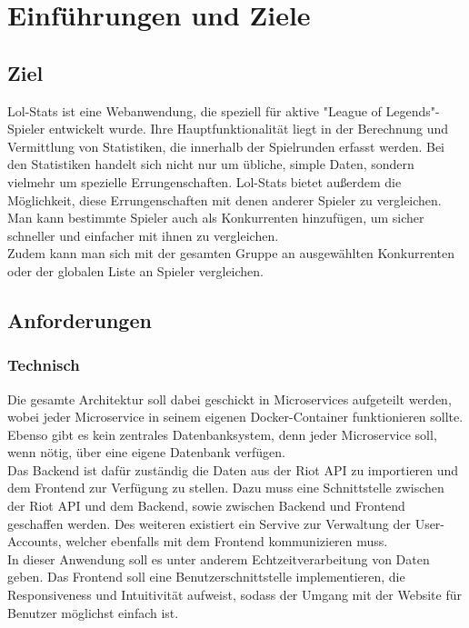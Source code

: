 \section{Einführungen und Ziele}
\subsection{Ziel}

Lol-Stats ist eine Webanwendung, die speziell für aktive "League of Legends"-Spieler entwickelt wurde. Ihre Hauptfunktionalität liegt in der Berechnung und Vermittlung
von Statistiken, die innerhalb der Spielrunden erfasst werden. Bei den Statistiken handelt sich nicht nur um übliche, simple Daten, sondern vielmehr um spezielle Errungenschaften. 
Lol-Stats bietet außerdem die Möglichkeit, diese Errungenschaften mit denen anderer Spieler zu vergleichen. Man kann bestimmte Spieler auch als Konkurrenten hinzufügen, um sicher schneller und einfacher mit ihnen zu vergleichen.\\
Zudem kann man sich mit der gesamten Gruppe an ausgewählten Konkurrenten oder der globalen Liste an Spieler vergleichen.

\subsection{Anforderungen}

\subsubsection{Technisch}

Die gesamte Architektur soll dabei geschickt in Microservices aufgeteilt werden, wobei jeder Microservice in seinem eigenen Docker-Container funktionieren sollte.
Ebenso gibt es kein zentrales Datenbanksystem, denn jeder Microservice soll, wenn nötig, über eine eigene Datenbank verfügen.\\
Das Backend ist dafür zuständig die Daten aus der Riot API zu importieren und dem Frontend zur Verfügung zu stellen. Dazu muss eine Schnittstelle zwischen der Riot API und dem Backend, sowie zwischen Backend und Frontend geschaffen werden. Des weiteren existiert ein Servive zur Verwaltung der User-Accounts, welcher ebenfalls mit dem Frontend kommunizieren muss.\\
In dieser Anwendung soll es unter anderem Echtzeitverarbeitung von Daten geben.
Das Frontend soll eine Benutzerschnittstelle implementieren, die Responsiveness und Intuitivität aufweist, sodass der Umgang mit der Website für Benutzer möglichst einfach ist.
